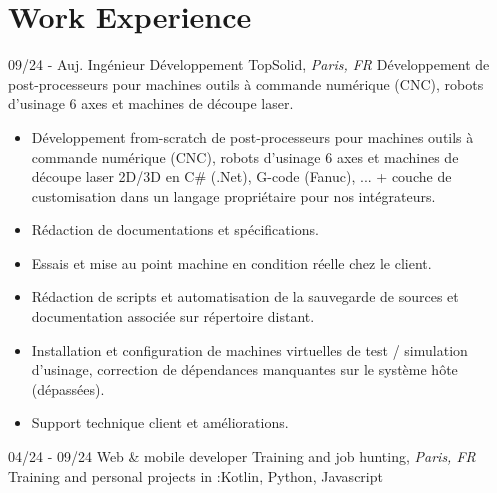 \documentclass[]{friggeri-cv}
\begin{document}
\section{Work Experience}
\vspace*{-0.25cm}

\begin{entrylist}
  \entry
    {09/24 - Auj.}
    {Ingénieur Développement}
    {TopSolid, \textit{Paris, FR}}
    {Développement de post-processeurs pour machines outils à commande numérique (CNC), robots d'usinage 6 axes et machines de découpe laser.}
\end{entrylist}
\vspace{-15pt}

\vspace{0.5mm}
\begin{itemize}
\setlength{\itemsep}{1pt}
\setlength{\parskip}{0pt}
\setlength{\parsep}{0pt}

\item Développement from-scratch de post-processeurs pour machines outils à commande numérique (CNC), robots d'usinage 6 axes et machines de découpe laser 2D/3D en C# (.Net), G-code (Fanuc), ... + couche de customisation dans un langage propriétaire pour nos intégrateurs.
\item Rédaction de documentations et spécifications.
\item Essais et mise au point machine en condition réelle chez le client.
\item Rédaction de scripts et automatisation de la sauvegarde de sources et documentation associée sur répertoire distant.
\item Installation et configuration de machines virtuelles de test / simulation d'usinage, correction de dépendances manquantes sur le système hôte (dépassées).
\item Support technique client et améliorations.
\end{itemize}

\begin{entrylist}
  \entry
    {04/24 - 09/24}
    {Web \& mobile developer}
    {Training and job hunting, \textit{Paris, FR}}
    {Training and personal projects in :\hspace*{8mm}Kotlin, Python, Javascript}
\end{entrylist}
\vspace{-15pt}
\end{document}
